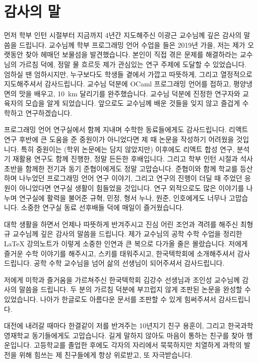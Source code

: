 \documentclass[en]{snu-cse-ms-thesis}
\begin{document}
\chapter*{감사의 말}
먼저 학부 인턴 시절부터 지금까지 4년간 지도해주신 이광근 교수님께 깊은 감사의 말씀을 드립니다.
교수님께 학부 프로그래밍 언어 수업을 들은 2019년 가을, 저는 제가 오랫동안 찾아 헤매던 보물섬을 발견했습니다.
본인이 직접 겪은 문제를 해결하라는 교수님의 가르침 덕에, 정말 물 흐르듯 제가 관심있는 연구 주제에 도달할 수 있었습니다.
엄하실 땐 엄하시지만, 누구보다도 학생들 곁에서 가깝고 따뜻하게, 그리고 열정적으로 지도해주셔서 감사드립니다.
교수님 덕분에 OCaml 프로그래밍 언어를 접하고, 평양냉면의 맛을 배우고, \qty{10}{km} 달리기를 완주했습니다.
교수님 덕분에 진정한 연구자와 교육자의 모습을 알게 되었습니다.
앞으로도 교수님께 배운 것들을 잊지 않고 즐겁게 수학하고 연구하겠습니다.

프로그래밍 언어 연구실에서 함께 지내며 수학한 동료들에게도 감사드립니다.
리액트 연구 후반에 큰 도움을 준 중원이가 아니었다면 제 때 논문을 작성하기 어려웠을 것입니다.
특히 중원이는 (학위 논문에는 담지 않았지만) 이후에도 리액트 합성 연구, 분석기 재활용 연구도 함께 진행한, 정말 든든한 후배입니다.
그리고 학부 인턴 시절과 석사 초반을 함께한 전기과 동기 준협이에게도 정말 고맙습니다.
준협이와 함께 학교를 등산하며 나누었던 프로그래밍 언어 연구 이야기, 그리고 연구의 진행이 더딜 때 주었던 응원이 아니었다면 연구실 생활이 힘들었을 것입니다.
연구 외적으로도 많은 이야기를 나누며 연구실에 활력을 불어준 규혁, 민정, 형서 누나, 원준, 인호에게도 너무나 고맙습니다.
소중한 연구실 동료 선후배들 덕에 매일이 즐거웠습니다.

대학 생활을 하면서 언제나 따뜻하게 반겨주시고 진심 어린 조언과 격려를 해주신 최형규 교수님께 깊은 감사의 말씀을 드립니다.
제가 교수님의 공학 수학 수업을 정리한 \LaTeX{} 강의노트가 이렇게 소중한 인연과 큰 복으로 다가올 줄은 몰랐습니다.
저에게 즐거운 수학 이야기를 해주시고, 스키를 태워주시고, 한국텍학회에 소개해주셔서 감사드립니다.
공학 수학 교수님을 넘어 삶의 선생님이 되어주셔서 감사드립니다.

저에게  미학과 즐거움을 가르쳐주신 한국텍학회 김강수 선생님과 조인성 교수님께 감사의 말씀을 드립니다.
두 분의 가르침 덕분에 부끄럽지 않게 조판된 논문을 완성할 수 있었습니다.
나아가  한글로도 아름다운 문서를 조판할 수 있게 힘써주셔서 감사드립니다.

대전에 내려갈 때마다 한결같이 저를 반겨주는 10년지기 친구 용훈이, 그리고 한국과학영재학교 동기들에게도 고맙습니다.
길게 말하지 않아도 마음이 통하는 친구를 찾아 행운입니다.
고등학교를 졸업한 후에도 각자의 자리에서 묵묵하지만 치열하게 과학의 발전을 위해 힘쓰는 제 친구들에게 항상 위로받고, 또 자극받습니다.
\end{document}
